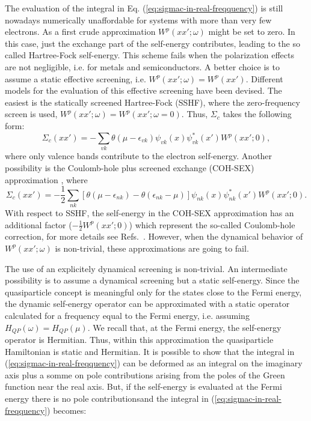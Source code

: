 \documentclass[11pt]{article}
\begin{document}
The evaluation of the integral in Eq. (\ref{eq:sigmac-in-real-freqquency}) is still
nowadays numerically unaffordable for systems with more than very few electrons. As a first crude approximation $W^p(xx';\omega)$ might be set to zero. 
In this case, just the exchange part of the self-energy contributes, 
leading to the so called Hartree-Fock self-energy.
This scheme fails when the polarization effects are not negligible,
i.e. for metals and semiconductors.
A better choice is to assume a static effective screening, i.e. $W^p(xx';\omega)=W^p(xx')$.
Different models for the evaluation of this effective screening have been devised.
The easiest is the statically screened Hartree-Fock (SSHF)\cite{fari+88prb},
where the zero-frequency screen is used, $W^p(xx';\omega)=W^p(xx';\omega=0)$. Thus, $\Sigma_c$
takes the following form:
\begin{equation}\label{sshf}
\Sigma_c(xx') = - \sum_{vk} \theta(\mu-\epsilon_{vk}) \psi_{vk}(x)\psi^*_{vk}(x')W^p(xx';0),
\end{equation} 
where only valence bands contribute to the electron self-energy. Another possibility is
the Coulomb-hole plus screened exchange (COH-SEX) approximation \cite{hedi-lund69ssp,fari+88prb},
where
\begin{equation}\label{cohsex}
\Sigma_c(xx') = -\frac{1}{2}\sum_{nk} [\theta(\mu-\epsilon_{nk})- \theta(\epsilon_{nk}-\mu)] \psi_{nk}(x)\psi^*_{nk}(x')W^p(xx';0).
\end{equation}
With respect to SSHF, the self-energy in the COH-SEX approximation has an additional factor ($- \frac{1}{2}W^p(xx';0)$)
which represent the so-called Coulomb-hole correction, for more details see Refs.~\cite{hedi-lund69ssp,fari99book}.
However, when the dynamical behavior of $W^p(xx';\omega)$ is non-trivial, these approximations
are going to fail.

The use of an explicitely dynamical screening is non-trivial. An intermediate possibility
is to assume a dynamical screening but a static self-energy.
Since the quasiparticle concept is meaningful only
for the states close to the Fermi energy, 
the dynamic self-energy operator can be approximated with a static operator
calculated for a frequency equal to the Fermi energy,
i.e. assuming $H_{QP}(\omega)=H_{QP}(\mu)$.
We recall that, at the Fermi energy, the self-energy operator
is Hermitian. Thus, within this approximation the 
quasiparticle Hamiltonian is static and Hermitian.
It is possible to show \cite{godb+88prb}
that the integral in (\ref{eq:sigmac-in-real-freqquency})
can be deformed as an integral on the imaginary axis plus a somme on pole contributions arising from the poles of the Green function near the real axis. But, if the self-energy is evaluated at the Fermi energy there is no pole contributionsand the integral in (\ref{eq:sigmac-in-real-freqquency}) becomes: 
\end{document}
